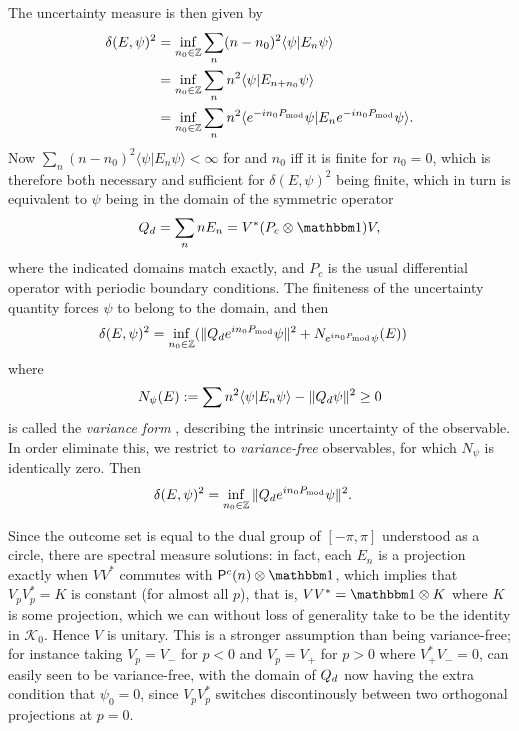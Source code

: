 The uncertainty measure is then given by
\begin{align*}
\delta(E,\psi)^2 &= \inf_{n_0\in \mathbb Z} \sum_n (n-n_0)^2 \langle \psi|E_n\psi\rangle \\
&= \inf_{n_0\in \mathbb Z} \sum_n n^2 \langle \psi|E_{n+n_0}\psi\rangle\\
& = \inf_{n_0\in \mathbb Z} \sum_n n^2 \langle e^{-in_0P_{\mathrm{mod}}}\psi|E_{n}e^{-in_0P_{\mathrm{mod}}}\psi\rangle.
\end{align*}
Now $\sum_n (n-n_0)^2 \langle \psi|E_n\psi\rangle<\infty$ for and $n_0$ iff it is finite for $n_0=0$, which is therefore both necessary and sufficient for $\delta(E,\psi)^2$ being finite, which in turn is equivalent to $\psi$ being in the domain of the symmetric operator
$$
\Qd = \sum_n n E_n = V^* (P_c\otimes \id) V,
$$
where the indicated domains match exactly, and $P_c$ is the usual differential operator with periodic boundary conditions. The finiteness of the uncertainty quantity forces $\psi$ to belong to the domain, and then
\begin{align*}
\delta(E,\psi)^2 &= \inf_{n_0\in \mathbb Z}(\|Q_d e^{in_0P_{\mathrm{mod}}}\psi\|^2 + N_{e^{in_0P_{\mathrm{mod}}}\psi}(E))
\end{align*}
where $$N_\psi(E) := \sum n^2 \langle \psi |E_n\psi\rangle - \|Q_d\psi\|^2\geq 0$$ is called the \emph{variance form} \cite{}, describing the intrinsic uncertainty of the observable. In order eliminate this, we restrict to \emph{variance-free} observables, for which $N_\psi$ is identically zero. Then 
\begin{align*}
\delta(E,\psi)^2 &= \inf_{n_0\in \mathbb Z} \|Q_d e^{in_0P_{\mathrm{mod}}}\psi\|^2.
\end{align*}

Since the outcome set is equal to the dual group of $[-\pi,\pi]$ understood as a circle, there are spectral measure solutions: in fact, each $E_n$ is a projection exactly when $VV^*$ commutes with $\Pc(n)\otimes \id$, which implies that $V_pV_p^* = K$ is constant (for almost all $p$), that is, $VV^* =\id \otimes K$ where $K$ is some projection, which we can without loss of generality take to be the identity in $\mathcal K_0$. Hence $V$ is unitary. This is a stronger assumption than being variance-free; for instance taking $V_p=V_-$ for $p<0$ and $V_p=V_+$ for $p>0$ where $V_+^*V_-=0$, can easily seen to be variance-free, with the domain of $Q_d$ now having the extra condition that $\psi_0=0$, since $V_pV_p^*$ switches discontinously between two orthogonal projections at $p=0$.

